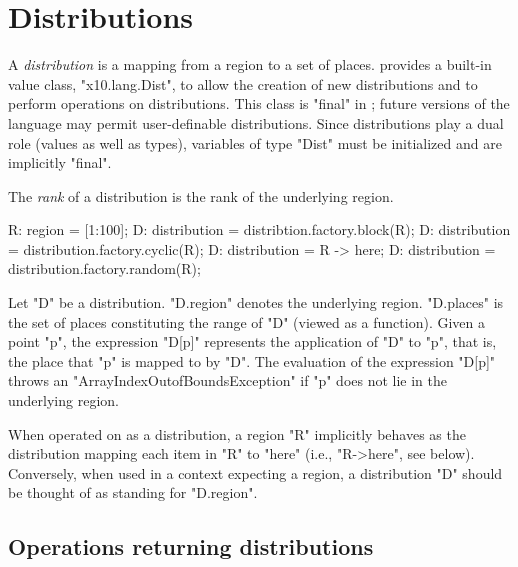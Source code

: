 \section{Distributions}\label{XtenDistributions}

A {\em distribution} is a mapping from a region to a set of places.
{}\Xten{} provides a built-in value class, \xcd"x10.lang.Dist", to allow the creation of new distributions and
to perform operations on distributions. This class is \xcd"final" in
{}\XtenCurrVer; future versions of the language may permit
user-definable distributions. Since distributions play a dual role
(values as well as types), variables of type \xcd"Dist" must
be initialized and are implicitly \xcd"final".

The {\em rank} of a distribution is the rank of the underlying region.



\begin{xten}
R: region = [1:100];
D: distribution = distribtion.factory.block(R);
D: distribution = distribution.factory.cyclic(R);
D: distribution = R -> here;
D: distribution = distribution.factory.random(R);
\end{xten}

Let \xcd"D" be a distribution. \xcd"D.region" denotes the underlying
region. \xcd"D.places" is the set of places constituting the range of
\xcd"D" (viewed as a function). Given a point \xcd"p", the expression
\xcd"D[p]" represents the application of \xcd"D" to \xcd"p", that is,
the place that \xcd"p" is mapped to by \xcd"D". The evaluation of the
expression \xcd"D[p]" throws an \xcd"ArrayIndexOutofBoundsException"
if \xcd"p" does not lie in the underlying region.

When operated on as a distribution, a region \xcd"R" implicitly
behaves as the distribution mapping each item in \xcd"R" to \xcd"here"
(i.e., \xcd"R->here", see below). Conversely, when used in a context
expecting a region, a distribution \xcd"D" should be thought of as
standing for \xcd"D.region".

{}

\subsection{Operations returning distributions}

